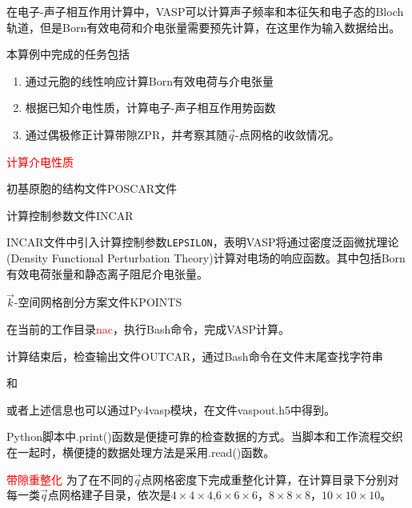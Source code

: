 在电子-声子相互作用计算中，\textrm{VASP}可以计算声子频率和本征矢和电子态的\textrm{Bloch}轨道，但是\textrm{Born}有效电荷和介电张量需要预先计算，在这里作为输入数据给出。

本算例中完成的任务包括
\begin{enumerate}
	\item 通过元胞的线性响应计算\textrm{Born}有效电荷与介电张量
	\item 根据已知介电性质，计算电子-声子相互作用势函数
	\item 通过偶极修正计算带隙\textrm{ZPR}，并考察其随$\vec q$-点网格的收敛情况。
\end{enumerate}

\textcolor{red}{计算介电性质}

初基原胞的结构文件\textrm{POSCAR}文件

计算控制参数文件\textrm{INCAR}

\textrm{INCAR}文件中引入计算控制参数\texttt{LEPSILON}，表明\textrm{VASP}将通过密度泛函微扰理论\textrm{(Density Functional Perturbation Theory)}计算对电场的响应函数。其中包括\textrm{Born}有效电荷张量和静态离子阻尼介电张量。

$\vec k$-空间网格剖分方案文件\textrm{KPOINTS}

在当前的工作目录\textcolor{red}{\textrm{nac}}，执行\textrm{Bash}命令，完成\textrm{VASP}计算。

计算结束后，检查输出文件\textrm{OUTCAR}，通过\textrm{Bash}命令在文件末尾查找字符串\\

和


或者上述信息也可以通过\textrm{Py4vasp}模块，在文件\textrm{vaspout.h5}中得到。

\textrm{Python}脚本中\textrm{.print()}函数是便捷可靠的检查数据的方式。当脚本和工作流程交织在一起时，横便捷的数据处理方法是采用\textrm{.read()}函数。

\textcolor{red}{带隙重整化}
为了在不同的$\vec q$点网格密度下完成重整化计算，在计算目录下分别对每一类$\vec q$点网格建子目录，依次是$4\times4\times4$,$6\times6\times6$，$8\times8\times8$，$10\times10\times10$。

